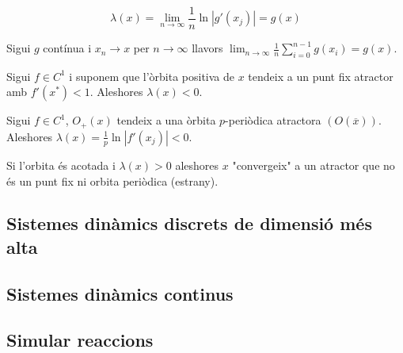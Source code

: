 \documentclass[../main.tex]{subfiles}
\begin{document}
\begin{displaymath}
    \lambda(x) = \lim_{n\to\infty} \frac{1}{n} \ln |g'(x_j)| = g(x)
\end{displaymath}
\begin{corolari}
    Sigui $g$ contínua i $x_n \rightarrow x$ per $n \to \infty$ llavors $\lim_{n\to\infty} \frac{1}{n} \sum_{i=0}^{n-1} g(x_i) = g(x)$.
\end{corolari}
\begin{proposicio}
    Sigui $f \in C^1$ i suponem que l'òrbita positiva de $x$ tendeix a un punt fix atractor amb $f'(x^*) < 1$. Aleshores $\lambda(x) < 0$.
\end{proposicio}
\begin{proposicio}
    Sigui $f \in C^1$, $O_+(x)$ tendeix a una òrbita $p$-periòdica atractora $(O(\overline{x}))$. Aleshores $\lambda(x) = \frac{1}{p} \ln |f'(x_j)| < 0$.
\end{proposicio}
\begin{corolari}
    Si l'orbita és acotada i $\lambda(x) > 0$ aleshores $x$ "convergeix" a un atractor que no és un punt fix ni orbita periòdica (estrany).
\end{corolari}
\subsection{Sistemes dinàmics discrets de dimensió més alta}
\subsection{Sistemes dinàmics continus}
\subsection{Simular reaccions}
\end{document}
